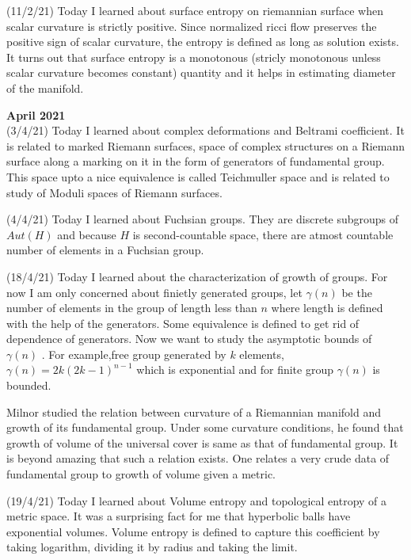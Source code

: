 \documentclass[12pt,a4paper]{article}
\begin{document}
 (11/2/21) Today I learned about surface entropy on riemannian surface when scalar curvature is strictly positive. Since normalized ricci flow preserves the positive sign of scalar curvature, the entropy is defined as long as solution exists. It turns out that surface entropy is a monotonous (stricly monotonous unless scalar curvature becomes constant) quantity and it helps in estimating diameter of the manifold.
  \\
 
 \maketitle\textbf{April 2021}
 \\
 
 (3/4/21) Today I learned about complex deformations and Beltrami coefficient. It is related to marked Riemann surfaces, space of complex structures on a Riemann surface along a marking on it in the form of generators of fundamental group. This space upto a nice equivalence is called Teichmuller space and is related to study of Moduli spaces of Riemann surfaces.
 
 (4/4/21) Today I learned about Fuchsian groups. They are discrete subgroups of $Aut(H)$ and because $H$ is second-countable space, there are atmost countable number of elements in a Fuchsian group.
 
 (18/4/21) Today I learned about the characterization of growth of groups. For now I am only concerned about finietly generated groups, let $\gamma(n)$ be the  number of elements in the group of length less than $n$ where length is defined with the help of the generators. Some equivalence is defined to get rid of dependence of generators. Now we want to study the asymptotic bounds of $\gamma(n)$ . For example,free group generated by $k$ elements, $\gamma(n) = 2k(2k-1)^{n-1}$ which is exponential and for finite group $\gamma(n)$ is bounded.
 
 Milnor studied the relation between curvature of a Riemannian manifold and growth of its fundamental group. Under some curvature conditions, he found that growth of volume of the universal cover is same as that of fundamental group. It is beyond amazing that such a relation exists. One relates a very crude data of fundamental group to growth of volume given a metric.
 
 (19/4/21) Today I learned about Volume entropy and topological entropy of a metric space. It was a surprising fact for me that hyperbolic balls have exponential volumes. Volume entropy is defined to capture this coefficient by taking logarithm, dividing it by radius and taking the limit.
 
\end{document}
